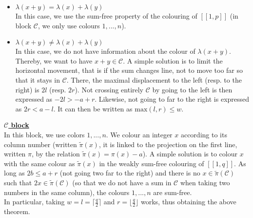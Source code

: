 \begin{itemize}
	\item \underline{\(\lambda(x+y) = \lambda(x) + \lambda(y)\)} \\
	In this case, we use the sum-free property of the colouring of \([\![1,p]\!]\) (in block \(\mathcal{C}\), we only use colours \(1, ..., n\)).

	\item \underline{\(\lambda(x+y) \neq \lambda(x) + \lambda(y)\)} \\
	In this case, we do not have information about the colour of \(\lambda(x+y)\). Thereby, we want to have \(x+y \in \mathcal{C}\).
	A simple solution is to limit the horizontal movement, that is if the sum changes line, not to move too far so that it stays in \(\mathcal{C}\).
	There, the maximal displacement to the left (resp. to the right) is \(2l\) (resp. \(2r\)). Not crossing entirely \(\mathcal{C}\) by going to the left
	is then expressed as \(-2l > -a + r\). Likewise, not going to far to the right is expressed as \(2r < a - l\). It can then be written as
	 \(\text{max}(l, r) \leqslant w\).
\end{itemize}

\underline{\textbf{\(\mathcal{C}\) block}} \\
In this block,  we use colors \(1, ..., n\). We colour an integer \(x\) according to its column number (written \(\tilde{\pi}(x)\), it is linked to the
projection on the first line, written \(\pi\), by the relation \(\tilde{\pi}(x) = \pi(x) - a\)). A simple solution is to colour \(x\) with the same colour
as \(\tilde{\pi}(x)\) in the weakly sum-free colouring of \([\![1,q]\!]\). As long as \(2b \leqslant a + r\) (not going two far to the right) and there
is no \(x \in \tilde{\pi}(\mathcal{C})\) such that \(2x \in \tilde{\pi}(\mathcal{C})\) (so that we do not have a sum in \(\mathcal{C}\) when
taking two numbers in the same column), the colours \(1, ..., n\) are sum-free. \\

In particular, taking \(w = l = \lceil \frac{q}{2} \rceil\) and \(r = \lfloor \frac{q}{2} \rfloor\) works, thus obtaining the above theorem. \\

